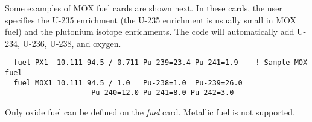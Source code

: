Some examples of MOX fuel cards are shown next.  In these cards, the user specifies
the U-235 enrichment (the U-235 enrichment is usually small in MOX fuel) and the
plutonium isotope enrichments.  The code will automatically add U-234, U-236, U-238,
and oxygen.
\begin{verbatim}
  fuel PX1  10.111 94.5 / 0.711 Pu-239=23.4 Pu-241=1.9    ! Sample MOX fuel
  fuel MOX1 10.111 94.5 / 1.0   Pu-238=1.0  Pu-239=26.0 
                    Pu-240=12.0 Pu-241=8.0 Pu-242=3.0 
\end{verbatim}

Only oxide fuel can be defined on the {\it fuel} card. Metallic fuel is not supported.

